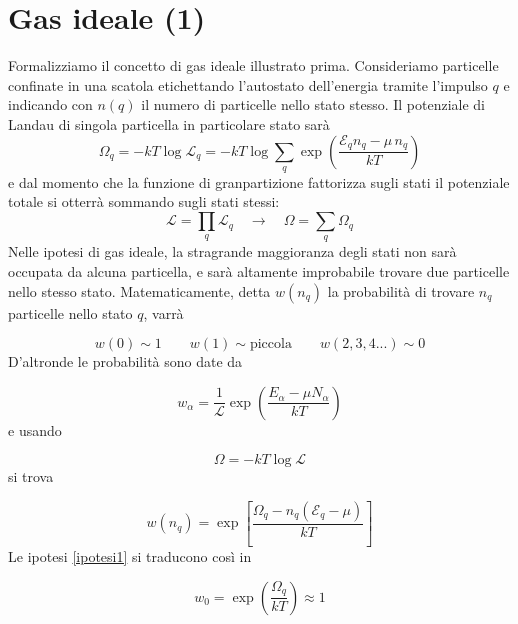 \documentclass[a4paper]{report}
\newcommand\ddfrac[2]{\frac{\displaystyle #1}{\displaystyle #2}}
\begin{document}
\section{Gas ideale (1)} \label{gas_ideale_1}

Formalizziamo il concetto di gas ideale illustrato prima. Consideriamo particelle confinate in una scatola etichettando l'autostato dell'energia tramite l'impulso $q$ e indicando con $n(q)$ il numero di particelle nello stato stesso. Il potenziale di Landau di singola particella in particolare stato sarà
\begin{equation}
    \Omega_{q} = -k T \log \mathcal{L}_{q} = -k T \log \sum_{q}\exp \left(\ddfrac{\mathcal{E}_{q} n_q - \mu\, n_q}{k T}\right)
\end{equation}
e dal momento che la funzione di granpartizione fattorizza sugli stati il potenziale totale si otterrà sommando sugli stati stessi:
\begin{equation}
    \mathcal{L} = \prod_q \mathcal{L}_q \quad\rightarrow \quad \Omega = \sum_q \Omega_q
\end{equation}
Nelle ipotesi di gas ideale, la stragrande maggioranza degli stati non sarà occupata da alcuna particella, e sarà altamente improbabile trovare due particelle nello stesso stato. Matematicamente, detta $w(n_q)$ la probabilità di trovare $n_q$ particelle nello stato $q$, varrà

\begin{equation}
    w(0) \sim 1 \qquad w(1) \sim \text{piccola} \qquad w(2,3,4...) \sim 0
    \label{ipotesi1}
\end{equation}
D'altronde le probabilità sono date da

\begin{equation}
    w_\alpha = \frac{1}{\mathcal{L}} \exp \left(\ddfrac{E_\alpha - \mu N_\alpha}{k T}\right)
\end{equation}
e usando

\begin{equation}
    \Omega = -k T \log \mathcal{L} 
\end{equation}
si trova

\begin{equation}
    w(n_q) = \exp\left[\ddfrac{\Omega_q - n_q(\mathcal{E}_q-\mu)}{k T}\right]
\end{equation}
Le ipotesi \eqref{ipotesi1} si traducono così in

\begin{equation}
    w_{0} = \exp \left(\frac{\Omega_q}{k T}\right) \approx 1
\end{equation}
\end{document}

